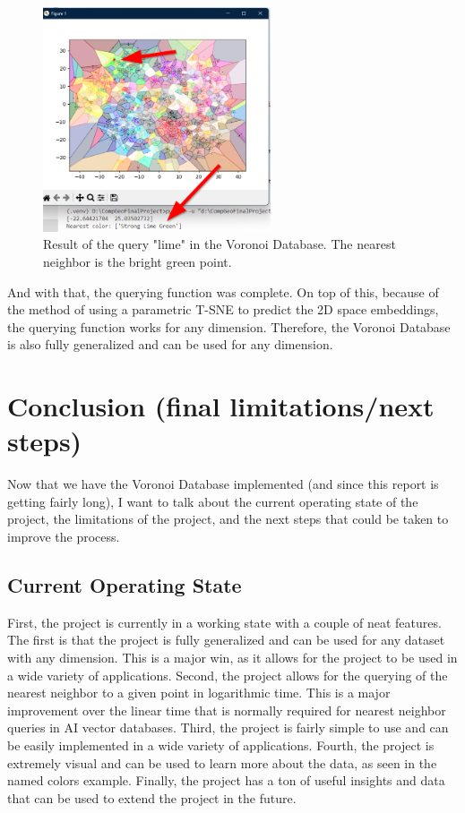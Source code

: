\documentclass{article}
\begin{document}
\begin{figure}[H]
\centering
\includegraphics[width=0.6\textwidth]{images/full_query_image.png}
\caption{Result of the query "lime" in the Voronoi Database. The nearest neighbor is the bright green point.}
\label{fig:queryresult}
\end{figure}

\noindent
And with that, the querying function was complete. On top of this, because of the method of using 
a parametric T-SNE to predict the 2D space embeddings, the querying function works for any dimension.
Therefore, the Voronoi Database is also fully generalized and can be used for any dimension.

\section{Conclusion (final limitations/next steps)}
Now that we have the Voronoi Database implemented (and since this report is getting fairly long), I want to talk about the current 
operating state of the project, the limitations of the project, and the next steps 
that could be taken to improve the process.

\subsection{Current Operating State}
First, the project is currently in a working state with a couple of neat features.
The first is that the project is fully generalized and can be used for any dataset
with any dimension. This is a major win, as it allows for the project to be used
in a wide variety of applications. Second, the project allows for the querying of
the nearest neighbor to a given point in logarithmic time. This is a major improvement
over the linear time that is normally required for nearest neighbor queries in AI
vector databases. Third, the project is fairly simple to use and can be easily
implemented in a wide variety of applications. Fourth, the project is extremely
visual and can be used to learn more about the data, as seen in the named colors
example. Finally, the project has a ton of useful insights and data that can be 
used to extend the project in the future.
\end{document}

